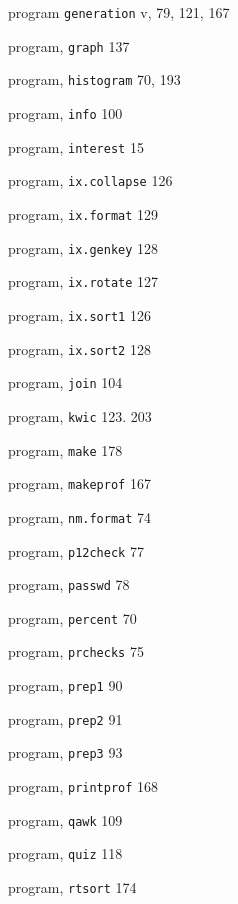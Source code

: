 \begin{multicols}{3}
\hangindent=3pc  program \verb'generation' v, 79, 121, 167

\hangindent=3pc  program, \verb'graph' 137

\hangindent=3pc  program, \verb'histogram' 70, 193

\hangindent=3pc  program, \verb'info' 100

\hangindent=3pc  program, \verb'interest' 15

\hangindent=3pc  program, \verb'ix.collapse' 126

\hangindent=3pc  program, \verb'ix.format' 129

\hangindent=3pc  program, \verb'ix.genkey' 128

\hangindent=3pc  program, \verb'ix.rotate' 127

\hangindent=3pc  program, \verb'ix.sort1' 126

\hangindent=3pc  program, \verb'ix.sort2' 128

\hangindent=3pc  program, \verb'join' 104

\hangindent=3pc  program, \verb'kwic' 123. 203

\hangindent=3pc  program, \verb'make' 178

\hangindent=3pc  program, \verb'makeprof' 167

\hangindent=3pc  program, \verb'nm.format' 74

\hangindent=3pc  program, \verb'p12check' 77

\hangindent=3pc  program, \verb'passwd' 78

\hangindent=3pc  program, \verb'percent' 70

\hangindent=3pc  program, \verb'prchecks' 75

\hangindent=3pc  program, \verb'prep1' 90

\hangindent=3pc  program, \verb'prep2' 91

\hangindent=3pc  program, \verb'prep3' 93

\hangindent=3pc  program, \verb'printprof' 168

\hangindent=3pc  program, \verb'qawk' 109

\hangindent=3pc  program, \verb'quiz' 118

\hangindent=3pc  program, \verb'rtsort' 174


\end{multicols}
